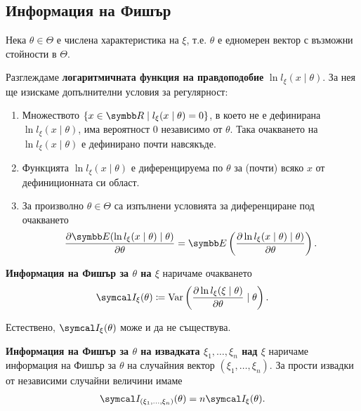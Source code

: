 \documentclass[numbers=endperiod, bibliography=totocnumbered]{scrartcl}
\begin{document}
\subsection{Информация на Фишър}

\begin{definition}\label{def:fisher_information}
  Нека \( \theta \in \Theta \) е числена характеристика на \( \xi \), т.е. \( \theta \) е едномерен вектор с възможни стойности в \( \Theta \).

  Разглеждаме \textbf{логаритмичната функция на правдоподобие} \( \ln l_\xi(x \mid \theta) \). За нея ще изискаме допълнителни условия за регулярност:
  \begin{enumerate}
    \item Множеството \( \{ x \in \R \mid l_\xi(x \mid \theta) = 0 \} \), в което не е дефинирана \( \ln l_\xi(x \mid \theta) \), има вероятност \( 0 \) независимо от \( \theta \). Така очакването на \( \ln l_\xi(x \mid \theta) \) е дефинирано почти навсякъде.
    \item Функцията \( \ln l_\xi(x \mid \theta) \) е диференцируема по \( \theta \) за (почти) всяко \( x \) от дефиниционната си област.
    \item За произволно \( \theta \in \Theta \) са изпълнени условията за диференциране под очакването
    \begin{align*}
      \frac {\partial \Expect(\ln l_\xi(x \mid \theta) \mid \theta)} {\partial \theta}
      =
      \Expect\left( \frac {\partial \ln l_\xi(x \mid \theta) \mid \theta)} {\partial \theta} \right).
    \end{align*}
  \end{enumerate}

  \textbf{Информация на Фишър за \( \theta \) на \( \xi \)} наричаме очакването
  \begin{align*}
    \FisherInfo_\xi(\theta) \coloneqq \Var\left( \frac {\partial \ln l_\xi(\xi \mid \theta)} {\partial \theta} \mid \theta \right).
  \end{align*}

  Естествено, \( \FisherInfo_\xi(\theta) \) може и да не съществува.

  \textbf{Информация на Фишър за \( \theta \) на извадката \( \xi_1, \ldots, \xi_n \) над \( \xi \)} наричаме информация на Фишър за \( \theta \) на случайния вектор \( (\xi_1, \ldots, \xi_n) \). За прости извадки от независими случайни величини имаме
  \begin{align*}
    \FisherInfo_{(\xi_1, \ldots, \xi_n)}(\theta) = n \FisherInfo_\xi(\theta).
  \end{align*}
\end{definition}
\end{document}
